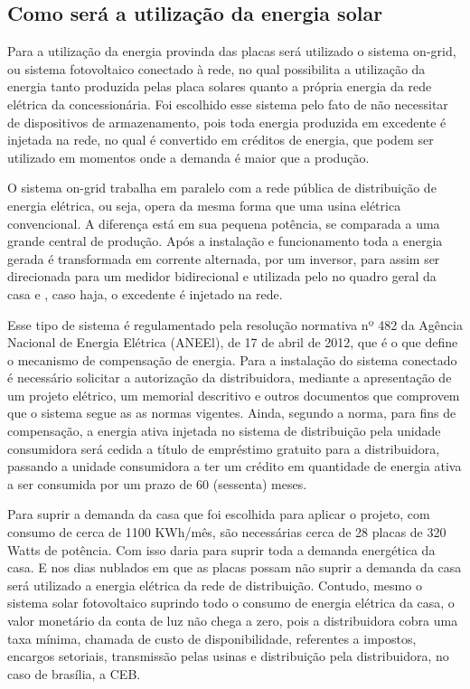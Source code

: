\subsection{Como será a utilização da energia solar}
\par Para a utilização da energia provinda das placas será utilizado o sistema on-grid, ou sistema fotovoltaico conectado à rede, no qual possibilita a utilização da energia tanto produzida pelas placa solares quanto a própria energia da rede elétrica da concessionária. Foi escolhido esse sistema pelo fato de não necessitar de dispositivos de armazenamento, pois toda energia produzida em excedente é injetada na rede, no qual é convertido em créditos de energia, que podem ser utilizado em momentos onde a demanda é maior que a produção.
\par O sistema on-grid trabalha em paralelo com a rede pública de distribuição de energia elétrica, ou seja, opera da mesma forma que  uma usina elétrica convencional. A diferença está em sua pequena potência, se comparada a uma grande central de produção. Após a instalação e funcionamento toda a energia gerada é transformada em corrente alternada, por um inversor, para assim ser direcionada para um medidor bidirecional e utilizada pelo no quadro geral da casa e , caso haja, o excedente é injetado na rede.
\par Esse tipo de sistema é regulamentado pela resolução normativa nº 482 da Agência Nacional de Energia Elétrica (ANEEl), de 17 de abril de 2012, que é o que define o mecanismo de compensação de energia. Para a instalação do sistema conectado é necessário solicitar a autorização da distribuidora, mediante a apresentação de um projeto elétrico, um memorial descritivo e outros documentos que comprovem que o sistema segue as as normas vigentes. Ainda, segundo a norma, para fins de compensação, a energia ativa injetada no sistema de distribuição pela unidade consumidora será cedida a título de empréstimo gratuito para a distribuidora, passando a unidade consumidora a ter um crédito em quantidade de energia ativa a ser consumida por um prazo de 60 (sessenta) meses.
\par Para suprir a demanda da casa que foi escolhida para aplicar o projeto, com consumo de cerca de 1100 KWh/mês, são necessárias cerca de 28 placas de 320 Watts de potência. Com isso daria para suprir toda a demanda energética da casa. E nos dias nublados em que as placas possam não suprir a demanda da casa será utilizado a energia elétrica da rede de distribuição. Contudo, mesmo o sistema solar fotovoltaico suprindo todo o consumo de energia elétrica da casa, o valor monetário da conta de luz não chega a zero, pois a distribuidora cobra uma taxa mínima, chamada de custo de disponibilidade, referentes a impostos, encargos setoriais, transmissão pelas usinas  e distribuição pela distribuidora, no caso de brasília, a CEB.

